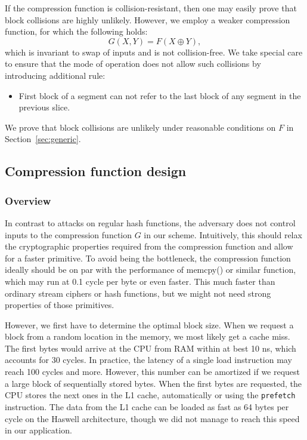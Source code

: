 \documentclass[a4paper]{article}
\begin{document}
If the compression function is collision-resistant, then one may easily prove that block collisions are highly unlikely. However, we employ a weaker compression function, for which the following holds:
$$
G(X,Y) = F(X\oplus Y),
$$
which is invariant to swap of inputs and is not collision-free. We take special care to ensure that the mode of operation does not allow such collisions by introducing additional rule:
\begin{itemize}
  \item First block of a segment can not refer to the last block of any segment in the previous slice.
\end{itemize}
We prove that block collisions are unlikely under reasonable conditions on $F$ in Section~\ref{sec:generic}.

  \subsection{Compression function design}\label{sec:compression}

  \subsubsection{Overview}

In contrast to attacks on regular hash functions, the adversary does not control inputs to the compression function $G$ in our scheme. Intuitively, this should relax the cryptographic properties required from the compression function and allow for a faster primitive. To avoid being the bottleneck, the compression function ideally should be on par with the performance of memcpy() or similar function, which may run at 0.1 cycle per byte or even faster. This much faster than ordinary stream ciphers or hash functions, but we might not need strong properties of those primitives.

However, we first have to determine the optimal block size. When we request a block from a random location in the memory, we most likely get a cache miss. The first bytes would arrive at the CPU from RAM within at best 10 ns, which accounts for 30 cycles. In practice, the latency of a single load instruction may reach 100 cycles and more. However, this number can be amortized if we request a large block of sequentially stored bytes. When the first bytes are requested, the CPU stores the next ones in the L1 cache, automatically or using the \texttt{prefetch} instruction. The data from the L1 cache can be loaded as fast as 64 bytes per cycle on the Haswell architecture, though we did not manage to reach this speed in our application.
\end{document}
